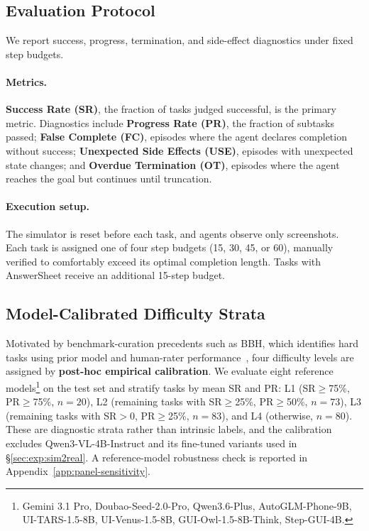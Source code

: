 \documentclass[11pt]{article}
\begin{document}
\subsection{Evaluation Protocol}\label{sec:bench:eval}

We report success, progress, termination, and side-effect diagnostics under fixed step budgets.

\paragraph{Metrics.} \textbf{Success Rate (SR)}, the fraction of tasks judged successful, is the primary metric. Diagnostics include \textbf{Progress Rate (PR)}, the fraction of subtasks passed; \textbf{False Complete (FC)}, episodes where the agent declares completion without success; \textbf{Unexpected Side Effects (USE)}, episodes with unexpected state changes; and \textbf{Overdue Termination (OT)}, episodes where the agent reaches the goal but continues until truncation.

\paragraph{Execution setup.} The simulator is reset before each task, and agents observe only screenshots. Each task is assigned one of four step budgets (15, 30, 45, or 60), manually verified to comfortably exceed its optimal completion length. Tasks with AnswerSheet receive an additional 15-step budget.

\subsection{Model-Calibrated Difficulty Strata}\label{sec:bench:difficulty}

Motivated by benchmark-curation precedents such as BBH, which identifies hard tasks using prior model and human-rater performance~\cite{BBH}, four difficulty levels are assigned by \textbf{post-hoc empirical calibration}. We evaluate eight reference models\footnote{Gemini 3.1 Pro, Doubao-Seed-2.0-Pro, Qwen3.6-Plus, AutoGLM-Phone-9B, UI-TARS-1.5-8B, UI-Venus-1.5-8B, GUI-Owl-1.5-8B-Think, Step-GUI-4B.} on the test set and stratify tasks by mean SR and PR: L1 (SR${\geq}$75\%, PR${\geq}$75\%, $n{=}20$), L2 (remaining tasks with SR${\geq}$25\%, PR${\geq}$50\%, $n{=}73$), L3 (remaining tasks with SR${>}$0, PR${\geq}$25\%, $n{=}83$), and L4 (otherwise, $n{=}80$). These are diagnostic strata rather than intrinsic labels, and the calibration excludes Qwen3-VL-4B-Instruct and its fine-tuned variants used in §\ref{sec:exp:sim2real}. A reference-model robustness check is reported in Appendix~\ref{app:panel-sensitivity}.
\end{document}
